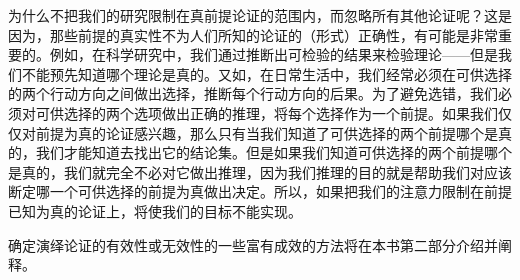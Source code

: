 为什么不把我们的研究限制在真前提论证的范围内，而忽略所有其他论证呢？这是因为，那些前提的真实性不为人们所知的论证的（形式）正确性，有可能是非常重要的。例如，在科学研究中，我们通过推断出可检验的结果来检验理论——但是我们不能预先知道哪个理论是真的。又如，在日常生活中，我们经常必须在可供选择的两个行动方向之间做出选择，推断每个行动方向的后果。为了避免选错，我们必须对可供选择的两个选项做出正确的推理，将每个选择作为一个前提。如果我们仅仅对前提为真的论证感兴趣，那么只有当我们知道了可供选择的两个前提哪个是真的，我们才能知道去找出它的结论集。但是如果我们知道可供选择的两个前提哪个是真的，我们就完全不必对它做出推理，因为我们推理的目的就是帮助我们对应该断定哪一个可供选择的前提为真做出决定。所以，如果把我们的注意力限制在前提已知为真的论证上，将使我们的目标不能实现。

确定演绎论证的有效性或无效性的一些富有成效的方法将在本书第二部分介绍并阐释。

\begin{center}
\end{center} 
